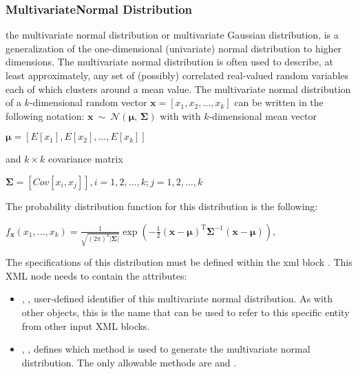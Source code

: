 \subsubsection{MultivariateNormal Distribution}
\label{MultivariateNormal}
the multivariate normal distribution or multivariate Gaussian distribution, is a generalization of the one-dimensional (univariate) normal distribution to higher dimensions.
The multivariate normal distribution is often used to describe, at least approximately, any set of (possibly) correlated real-valued random variables each of which clusters around a mean value.
The multivariate normal distribution of a $k$-dimensional random vector $\mathbf{x} = [x_1, x_2, …, x_k]$  can be written in the following notation:
$ \mathbf{x}\ \sim\ \mathcal{N}(\boldsymbol\mu,\, \boldsymbol\Sigma)$
with with $k$-dimensional mean vector

$\boldsymbol\mu= [E[x_1], E[x_2], …, E[x_k]]$

and $k \times k$ covariance matrix

$\boldsymbol\Sigma = [Cov[x_i,x_j]] , i=1,2,\ldots,k ; j=1,2,\ldots,k$

The probability distribution function for this distribution is the following:

$
f_{\mathbf x}(x_1,\ldots,x_k) =
\frac{1}{\sqrt{(2\pi)^k|\boldsymbol\Sigma|}}
\exp\left(-\frac{1}{2}({\mathbf x}-{\boldsymbol\mu})^\mathrm{T}{\boldsymbol\Sigma}^{-1}({\mathbf x}-{\boldsymbol\mu})
\right),
$

The specifications of this distribution must be defined within the xml block .
This XML node needs to contain the attributes:
\vspace{-5mm}
\begin{itemize}
\itemsep0em
\item {}, , user-defined identifier of this multivariate normal distribution.
%
\nb As with other objects, this is the name that can be used to refer to this specific entity from other input XML blocks.
\item {}, , defines which method is used to generate the multivariate normal distribution.
The only allowable methods are  and .
%
\end{itemize}
\vspace{-5mm}

